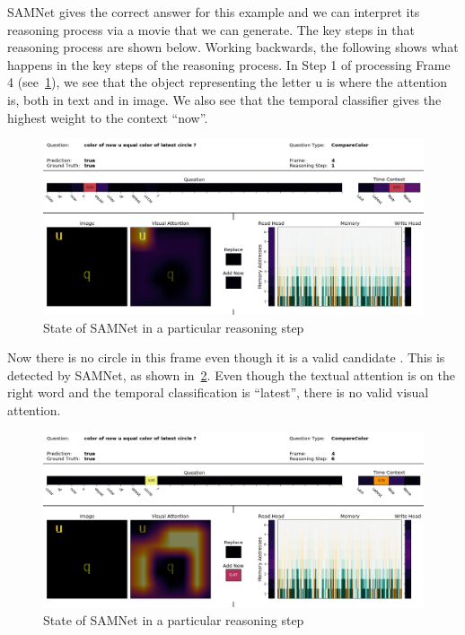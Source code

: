 SAMNet gives the correct answer for this example and we can interpret its reasoning process via a movie that we can generate.
The key steps in that reasoning process are shown below. Working backwards, the following shows what happens in the key steps
of the reasoning process.
In Step 1 of processing Frame 4 (see~\cref{fig:frame-4-step-1}), we see that the object representing the letter u is where the attention 
is, both in text and in image. We also see that the temporal classifier gives the highest weight to the context ``now''.
\begin{figure}[!h]
\centering
  \includegraphics[width=\textwidth]{"../img/visualization/experiment_run_20190917_022319/Frame 4 Step 1"}
\caption{State of SAMNet in a particular reasoning step} 
\label{fig:frame-4-step-1}
\end{figure}

Now there is no circle in this frame even though it is a valid candidate . This is detected by SAMNet,
as shown in~\cref{fig:frame-4-step-6}. Even though the textual attention is on the right word
and the temporal classification is ``latest'', there
is no valid visual attention.
\begin{figure}[!h]
	\centering
	\includegraphics[width=\textwidth]{"../img/visualization/experiment_run_20190917_022319/Frame 4 Step 6"}
	\caption{State of SAMNet in a particular reasoning step} 
	\label{fig:frame-4-step-6}
\end{figure}


